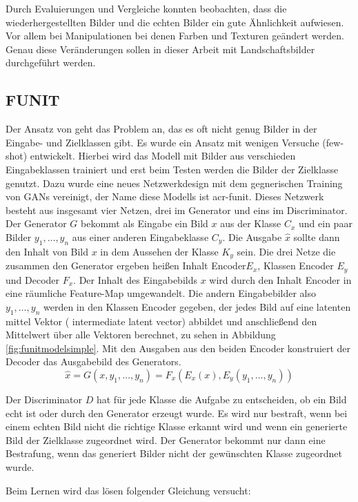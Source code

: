  Durch Evaluierungen und Vergleiche konnten \citeauthor{zhu_unpaired_2020} beobachten, dass die wiederhergestellten Bilder und die echten Bilder ein gute Ähnlichkeit aufwiesen. Vor allem bei Manipulationen bei denen Farben und Texturen geändert werden. Genau diese Veränderungen sollen in dieser Arbeit mit Landschaftsbilder durchgeführt werden. 
 
 \subsection{FUNIT}%
 Der Ansatz von \citeauthor{liu_few-shot_2019} \cite{liu_few-shot_2019}  geht das Problem an, das es oft nicht genug Bilder in der Eingabe- und Zielklassen gibt. Es wurde ein Ansatz mit wenigen Versuche (few-shot) entwickelt. Hierbei wird das Modell mit Bilder aus verschieden Eingabeklassen trainiert und erst beim Testen werden die Bilder der Zielklasse genutzt.
 Dazu wurde eine neues Netzwerkdesign mit dem gegnerischen Training von GANs vereinigt, der Name diese Modells ist  \acrfull{acr-funit}. Dieses Netzwerk besteht aus insgesamt vier Netzen, drei im Generator und eins im Discriminator. Der Generator $G$ bekommt als Eingabe ein Bild $x$ aus der Klasse $C_x$ und ein paar Bilder $y_1,\dots,y_n$ aus einer anderen Eingabeklasse $C_y$. Die Ausgabe $\hat{x}$ sollte dann den Inhalt von Bild $x$ in dem Aussehen der Klasse $K_y$ sein. 
 Die drei Netze die zusammen den Generator ergeben heißen Inhalt Encoder$E_x$, Klassen Encoder $E_y$ und Decoder $F_x$.
 Der Inhalt des Eingabebilds $x$ wird durch den Inhalt Encoder in eine räumliche Feature-Map umgewandelt. Die andern Eingabebilder also  $y_1,\dots,y_n$ werden in den Klassen Encoder gegeben, der  jedes Bild auf eine latenten mittel Vektor ( intermediate latent vector) abbildet und anschließend den Mittelwert über alle Vektoren berechnet, zu sehen in Abbildung \ref{fig:funitmodelsimple}. 
 Mit den Ausgaben aus den beiden Encoder konstruiert der Decoder das Ausgabebild des Generators. 
 \[\hat{x} = G(x, y_1,\dots,y_n)= F_x(E_x(x), E_y(y_1,\dots,y_n))\]
 
 Der Discriminator $D$ hat für jede Klasse die Aufgabe zu entscheiden, ob ein Bild echt ist oder durch den Generator erzeugt wurde. Es wird nur bestraft, wenn bei einem echten Bild nicht die richtige Klasse erkannt wird und wenn ein generierte Bild der Zielklasse zugeordnet wird. Der Generator bekommt nur dann eine Bestrafung, wenn das generiert Bilder nicht der gewünschten Klasse zugeordnet wurde.
 
 Beim Lernen wird das lösen folgender Gleichung versucht:
 
